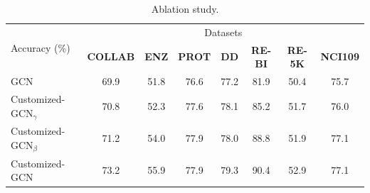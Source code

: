 \documentclass[11pt,dvipdfm]{article}
\begin{document}
\begin{table}[h]
\small
\begin{center}

\caption{Ablation study.}

\begin{tabular*}{\textwidth}{@{\extracolsep{\fill}}lccccccc@{\extracolsep{\fill}}}
\toprule%


  \multirow{2}{*}{Accuracy (\%)}&\multicolumn{7}{c}{Datasets} \\\cmidrule{2-8}%
                    & \textbf{COLLAB}   & \textbf{ENZ}  & \textbf{PROT}     & \textbf{DD}       & \textbf{RE-BI}    & \textbf{RE-5K}       & \textbf{NCI109} \\ \midrule
GCN             & 69.9   &51.8  & 76.6 & 77.2  &81.9   &50.4    & 75.7        \\
Customized-GCN$_{\gamma}$ & 70.8   & 52.3  & 77.6  & 78.1 &85.2  &51.7    & 76.0     \\
Customized-GCN$_{\beta}$  &71.2   &54.0  &77.9   & 78.0 & 88.8 & 51.9   &77.1            \\\midrule
Customized-GCN    &73.2   & 55.9  & 77.9 & 79.3  & 90.4 &52.9   & 77.1        \\\bottomrule
  \end{tabular*} 

  \label{table:ablation}

\end{center}
\end{table}
\end{document}
